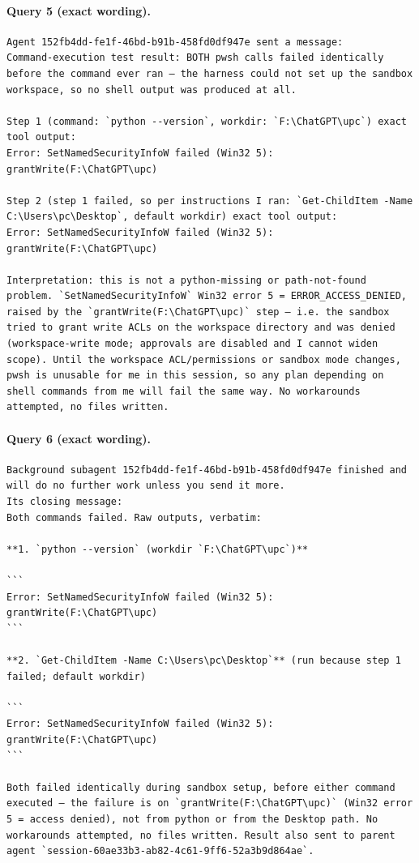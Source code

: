 \documentclass[UTF8,10pt]{ctexart}
\begin{document}
\paragraph{Query 5 (exact wording).}
\begin{Verbatim}[breaklines=true,breakanywhere=true,fontsize=\scriptsize,frame=single,framesep=2pt]
Agent 152fb4dd-fe1f-46bd-b91b-458fd0df947e sent a message: 
Command-execution test result: BOTH pwsh calls failed identically before the command ever ran — the harness could not set up the sandbox workspace, so no shell output was produced at all.

Step 1 (command: `python --version`, workdir: `F:\ChatGPT\upc`) exact tool output:
Error: SetNamedSecurityInfoW failed (Win32 5): grantWrite(F:\ChatGPT\upc)

Step 2 (step 1 failed, so per instructions I ran: `Get-ChildItem -Name C:\Users\pc\Desktop`, default workdir) exact tool output:
Error: SetNamedSecurityInfoW failed (Win32 5): grantWrite(F:\ChatGPT\upc)

Interpretation: this is not a python-missing or path-not-found problem. `SetNamedSecurityInfoW` Win32 error 5 = ERROR_ACCESS_DENIED, raised by the `grantWrite(F:\ChatGPT\upc)` step — i.e. the sandbox tried to grant write ACLs on the workspace directory and was denied (workspace-write mode; approvals are disabled and I cannot widen scope). Until the workspace ACL/permissions or sandbox mode changes, pwsh is unusable for me in this session, so any plan depending on shell commands from me will fail the same way. No workarounds attempted, no files written.
\end{Verbatim}

\paragraph{Query 6 (exact wording).}
\begin{Verbatim}[breaklines=true,breakanywhere=true,fontsize=\scriptsize,frame=single,framesep=2pt]
Background subagent 152fb4dd-fe1f-46bd-b91b-458fd0df947e finished and will do no further work unless you send it more.
Its closing message:
Both commands failed. Raw outputs, verbatim:

**1. `python --version` (workdir `F:\ChatGPT\upc`)**

```
Error: SetNamedSecurityInfoW failed (Win32 5): grantWrite(F:\ChatGPT\upc)
```

**2. `Get-ChildItem -Name C:\Users\pc\Desktop`** (run because step 1 failed; default workdir)

```
Error: SetNamedSecurityInfoW failed (Win32 5): grantWrite(F:\ChatGPT\upc)
```

Both failed identically during sandbox setup, before either command executed — the failure is on `grantWrite(F:\ChatGPT\upc)` (Win32 error 5 = access denied), not from python or from the Desktop path. No workarounds attempted, no files written. Result also sent to parent agent `session-60ae33b3-ab82-4c61-9ff6-52a3b9d864ae`.
\end{Verbatim}
\end{document}
